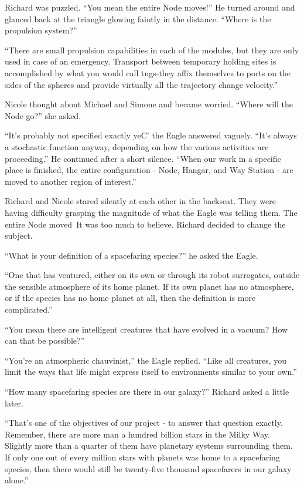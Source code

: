 \documentclass[]{article}
\begin{document}
{Richard was puzzled. “You mean the entire Node moves!” He turned around and glanced back at the triangle glowing faintly in the distance. “Where is the propulsion system?”

“There are small propulsion capabilities in each of the modules, but they are only used in case of an emergency. Transport between temporary holding sites is accomplished by what you would call tugs-they affix themselves to ports on the sides of the spheres and provide virtually all the trajectory change velocity.”

Nicole thought about Michael and Simone and became worried. “Where will the Node go?” she asked.

“It’s probably not specified exactly yeC’ the Eagle answered vaguely. “It’s always a stochastic function anyway, depending on how the various activities are proceeding.” He continued after a short silence. “When our work in a specific place is finished, the entire configuration - Node, Hangar, and Way Station - are moved to another region of interest.”

Richard and Nicole stared silently at each other in the backseat. They were having difficulty grasping the magnitude of what the Eagle was telling them. The entire Node moved\ It was too much to believe. Richard decided to change the subject.

“What is your definition of a spacefaring species?” he asked the Eagle.

“One that has ventured, either on its own or through its robot surrogates, outside the sensible atmosphere of its home planet. If its own planet has no atmosphere, or if the species has no home planet at all, then the definition is more complicated.”

“You mean there are intelligent creatures that have evolved in a vacuum? How can that be possible?”

“You’re an atmospheric chauvinist,” the Eagle replied. “Like all creatures, you limit the ways that life might express itself to environments similar to your own.”

“How many spacefaring species are there in our galaxy?” Richard asked a little later.

“That’s one of the objectives of our project - to answer that question exactly. Remember, there are more man a hundred billion stars in the Milky Way. Slightly more than a quarter of them have planetary systems surrounding them. If only one out of every million stars with planets was home to a spacefaring species, then there would still be twenty-five thousand spacefarers in our galaxy alone.”

}
\end{document}
